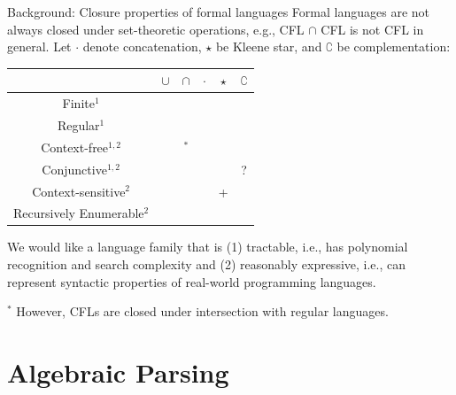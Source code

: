 \documentclass{beamer}
\newcommand{\cmark}{\ding{51}}%
\newcommand{\xmark}{\ding{55}}%
\begin{document}
\begin{frame}[fragile]{Background: Closure properties of formal languages}
  Formal languages are not always closed under set-theoretic operations, e.g., CFL $\cap$ CFL is not CFL in general. Let $\cdot$ denote concatenation, $\star$ be Kleene star, and $\complement$ be complementation:\\
  \begin{table}
    \begin{tabular}{c|ccccc}
      & $\cup$ & $\cap$ & $\cdot$ & $\star$ & $\complement$ \\\hline
      Finite$^1$                                  & \cmark & \cmark     & \cmark  & \cmark  & \cmark \\
      Regular$^1$                                 & \cmark & \cmark     & \cmark  & \cmark  & \cmark \\
      \rowcolor{slightgray} Context-free$^{1, 2}$ & \cmark & \xmark$^*$ & \cmark  & \cmark  & \xmark \\
      Conjunctive$^{1,2}$                         & \cmark & \cmark     & \cmark  & \cmark  & ?      \\
      Context-sensitive$^2$                       & \cmark & \cmark     & \cmark  & +       & \cmark \\
      Recursively Enumerable$^2$                  & \cmark & \cmark     & \cmark  & \cmark  & \xmark \\
    \end{tabular}
  \end{table}
  We would like a language family that is (1) tractable, i.e., has polynomial recognition and search complexity and (2) reasonably expressive, i.e., can represent syntactic properties of real-world programming languages.

  $^*$ However, CFLs are closed under intersection with regular languages.
\end{frame}

\section{Algebraic Parsing}\label{sec:algebraic-parsing}
\end{document}
